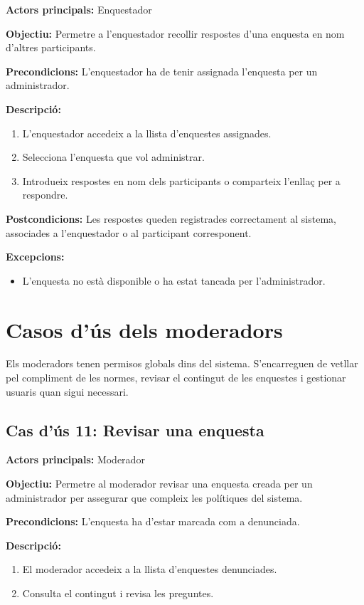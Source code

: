 \documentclass[../main.tex]{subfiles}
\begin{document}
\textbf{Actors principals:} Enquestador

\textbf{Objectiu:} Permetre a l’enquestador recollir respostes d’una enquesta en nom d’altres participants.

\textbf{Precondicions:}  
L’enquestador ha de tenir assignada l’enquesta per un administrador.

\textbf{Descripció:}
\begin{enumerate}
    \item L’enquestador accedeix a la llista d’enquestes assignades.
    \item Selecciona l’enquesta que vol administrar.
    \item Introdueix respostes en nom dels participants o comparteix l’enllaç per a respondre.
\end{enumerate}

\textbf{Postcondicions:}  
Les respostes queden registrades correctament al sistema, associades a l’enquestador o al participant corresponent.

\textbf{Excepcions:}
\begin{itemize}
    \item L’enquesta no està disponible o ha estat tancada per l’administrador.
\end{itemize}

\section{Casos d’ús dels moderadors}

Els moderadors tenen permisos globals dins del sistema.
S’encarreguen de vetllar pel compliment de les normes, revisar el contingut de les enquestes i gestionar usuaris quan sigui necessari.

\subsection*{Cas d’ús 11: Revisar una enquesta}

\textbf{Actors principals:} Moderador

\textbf{Objectiu:} Permetre al moderador revisar una enquesta creada per un administrador per assegurar que compleix les polítiques del sistema.

\textbf{Precondicions:}  
L’enquesta ha d'estar marcada com a denunciada.

\textbf{Descripció:}
\begin{enumerate}
    \item El moderador accedeix a la llista d’enquestes denunciades.
    \item Consulta el contingut i revisa les preguntes.
\end{enumerate}
\end{document}

